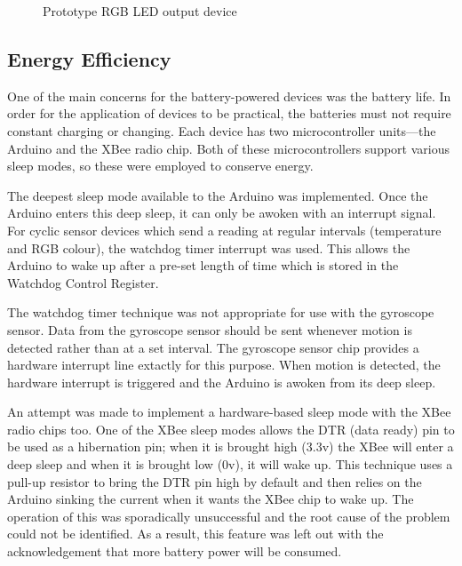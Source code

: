       \begin{figure}
        \centering
        \caption{Prototype RGB LED output device}\label{figure:led-device}
      \end{figure}

    \subsection{Energy Efficiency}
      One of the main concerns for the battery-powered devices was the battery life. In order for the application of devices to be practical, the batteries must not require constant charging or changing. Each device has two microcontroller units---the Arduino and the XBee radio chip. Both of these microcontrollers support various sleep modes, so these were employed to conserve energy.

      The deepest sleep mode available to the Arduino was implemented. Once the Arduino enters this deep sleep, it can only be awoken with an interrupt signal. For cyclic sensor devices which send a reading at regular intervals (temperature and RGB colour), the watchdog timer interrupt was used. This allows the Arduino to wake up after a pre-set length of time which is stored in the Watchdog Control Register.

      The watchdog timer technique was not appropriate for use with the gyroscope sensor. Data from the gyroscope sensor should be sent whenever motion is detected rather than at a set interval. The gyroscope sensor chip provides a hardware interrupt line extactly for this purpose. When motion is detected, the hardware interrupt is triggered and the Arduino is awoken from its deep sleep.

      An attempt was made to implement a hardware-based sleep mode with the XBee radio chips too. One of the XBee sleep modes allows the DTR (data ready) pin to be used as a hibernation pin; when it is brought high (3.3v) the XBee will enter a deep sleep and when it is brought low (0v), it will wake up. This technique uses a pull-up resistor to bring the DTR pin high by default and then relies on the Arduino sinking the current when it wants the XBee chip to wake up. The operation of this was sporadically unsuccessful and the root cause of the problem could not be identified. As a result, this feature was left out with the acknowledgement that more battery power will be consumed.

